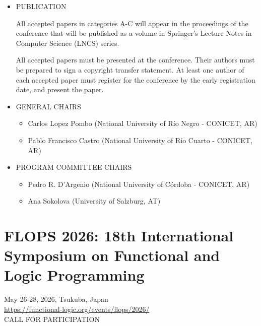 \documentclass[prodmode,acmtecs]{acmsmall} %
\begin{document}
\begin{itemize}
  All contributions to ICTAC 2026 have to be submitted electronically in PDF format via Easy Chair \href{https://easychair.org/conferences/?conf=ictac2026}{https://easychair.org/conferences/?conf=ictac2026} Papers must be formatted according to the guidelines for Springer LNCS papers (see \href{https://www.springer.com/gp/computer-science/lncs}{https://www.springer.com/gp/computer-science/lncs}), without modifications of margins and other space-saving measures. Authors should therefore consult Springer’s authors’ instructions and use their proceedings templates, either for LaTeX or for Word, for the preparation of their papers. Springer encourages  authors to include their ORCIDs in their papers. 
 
\item  PUBLICATION 
 
  All accepted papers in categories A-C will appear in the proceedings of the conference that will be published as a volume in Springer’s Lecture Notes in Computer Science (LNCS) series.  
 
  All accepted papers must be presented at the conference. Their authors must be prepared to sign a copyright transfer statement. At least one author of each accepted paper must register for the conference by the early registration date, and present the paper. 
 
\item  GENERAL CHAIRS 
 
\begin{itemize}\item  Carlos Lopez Pombo (National University of Río Negro - CONICET, AR)
\item  Pablo Francisco Castro (National University of Río Cuarto - CONICET, AR)
\end{itemize} 
\item  PROGRAM COMMITTEE CHAIRS 
 
\begin{itemize}\item  Pedro R. D'Argenio (National University of Córdoba - CONICET, AR)
\item  Ana Sokolova (University of Salzburg, AT)
\end{itemize} 
\end{itemize}\section{FLOPS 2026: 18th International Symposium on Functional and Logic Programming}\label{FLOPS2026}  May 26-28, 2026, Tsukuba, Japan\\ 
  \href{https://functional-logic.org/events/flops/2026/}{https://functional-logic.org/events/flops/2026/}\\ 
CALL FOR PARTICIPATION 
\end{document}
